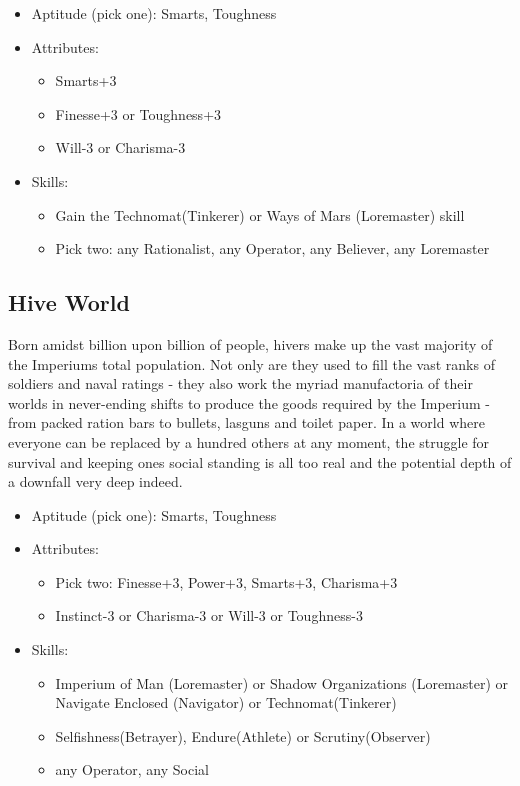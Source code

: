 \begin{itemize}
	\item Aptitude (pick one): Smarts, Toughness
	\item Attributes:
	\begin{itemize}
		\item Smarts+3
		\item Finesse+3 or Toughness+3
		\item Will-3 or Charisma-3
	\end{itemize}
	\item Skills: 
	\begin{itemize}
	 	\item Gain the Technomat(Tinkerer) or Ways of Mars (Loremaster) skill
	 	\item Pick two: any Rationalist, any Operator, any Believer, any Loremaster
	 \end{itemize} 
\end{itemize}

\subsection{Hive World}
Born amidst billion upon billion of people, hivers make up the vast majority of the Imperiums total population. Not only are they used to fill the vast ranks of soldiers and naval ratings - they also work the myriad manufactoria of their worlds in never-ending shifts to produce the goods required by the Imperium - from packed ration bars to bullets, lasguns and toilet paper. In a world where everyone can be replaced by a hundred others at any moment, the struggle for survival and keeping ones social standing is all too real and the potential depth of a downfall very deep indeed.

\begin{itemize}
	\item Aptitude (pick one): Smarts, Toughness
	\item Attributes:
	\begin{itemize}
		\item Pick two: Finesse+3, Power+3, Smarts+3, Charisma+3
		\item Instinct-3 or Charisma-3 or Will-3 or Toughness-3
	\end{itemize}
	\item Skills: 
	\begin{itemize}
	 	\item Imperium of Man (Loremaster) or Shadow Organizations (Loremaster) or Navigate Enclosed (Navigator) or Technomat(Tinkerer)
	 	\item Selfishness(Betrayer), Endure(Athlete) or Scrutiny(Observer)
	 	\item any Operator, any Social
	 \end{itemize} 
\end{itemize}


